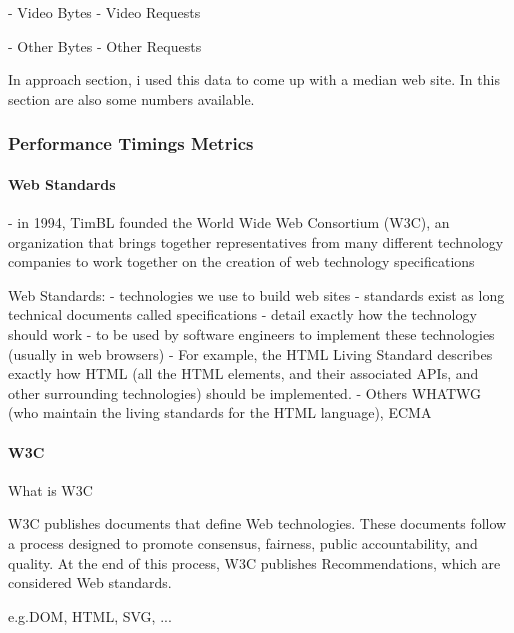 - Video Bytes
- Video Requests

- Other Bytes
- Other Requests


In approach section, i used this data to come up with a median web site.
In this section are also some numbers available.




\subsubsection{Performance Timings Metrics}


\paragraph{Web Standards}

- in 1994, TimBL founded the World Wide Web Consortium (W3C), an organization that brings together representatives from many different technology companies to work together on the creation of web technology specifications

Web Standards:
- technologies we use to build web sites
- standards exist as long technical documents called specifications
- detail exactly how the technology should work
-  to be used by software engineers to implement these technologies (usually in web browsers)
- For example, the HTML Living Standard describes exactly how HTML (all the HTML elements, and their associated APIs, and other surrounding technologies) should be implemented.
- Others  WHATWG (who maintain the living standards for the HTML language), ECMA



\paragraph{W3C}


What is W3C

W3C publishes documents that define Web technologies. These documents follow a process designed to promote consensus, fairness, public accountability, and quality. At the end of this process, W3C publishes Recommendations, which are considered Web standards.

e.g.DOM,  HTML, SVG, ...




